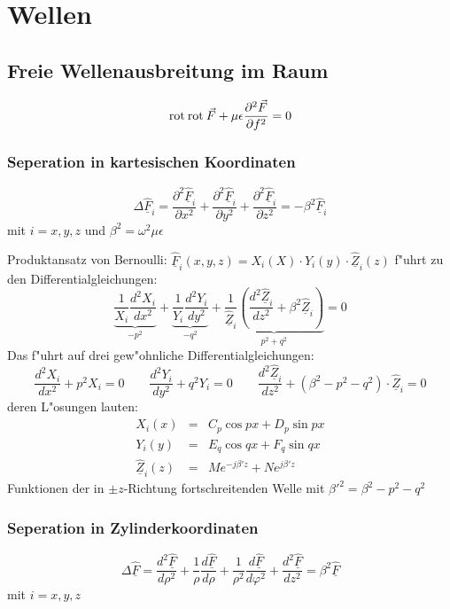 \clearpage \section{Wellen}
\subsection{Freie Wellenausbreitung im Raum}
$${\rm rot \:}{\rm rot \:} \vec{F}+\mu\epsilon\frac{\partial^2\vec{F}}{\partial f^2}=0$$

\subsubsection{Seperation in kartesischen Koordinaten}
$$\Delta\underline{\hat{F}}_i=\frac{\partial^2 \underline{\hat{F}}_i}{\partial
x^2}+\frac{\partial^2 \underline{\hat{F}}_i}{\partial
y^2}+\frac{\partial^2 \underline{\hat{F}}_i}{\partial
z^2}=-\beta^2\underline{\hat{F}}_i $$
mit $i=x,y,z$ und $\beta^2=\omega^2\mu\epsilon$

Produktansatz von Bernoulli:
$\underline{\hat{F}}_i(x,y,z)=X_i(X)\cdot Y_i(y)\cdot \underline{\hat{Z}}_i(z)$
f"uhrt zu den Differentialgleichungen:
$$\underbrace{\frac{1}{X_i}\frac{d^2X_i}{dx^2}}_{-p^2}+
  \underbrace{\frac{1}{Y_i}\frac{d^2Y_i}{dy^2}}_{-q^2}+\underbrace{\frac{1}{
   \underline{\hat{Z}}_i}\left(\frac{d^2\underline{\hat{Z}}_i}{dz^2}+\beta^2
   \underline{\hat{Z}}_i\right)}_{p^2+q^2}=0$$
Das f"uhrt auf drei gew"ohnliche Differentialgleichungen:
$$\frac{d^2X_i}{dx^2}+p^2X_i=0 \qquad \frac{d^2Y_i}{dy^2}+q^2Y_i=0 \qquad
\frac{d^2\underline{\hat{Z}}_i}{dz^2}+(\beta^2-p^2-q^2)\cdot\underline{\hat{Z}}_i=0$$
deren L"osungen lauten:
\begin{eqnarray*}
X_i(x)&=&C_p\cos px+D_p\sin px\\Y_i(y)&=&E_q\cos qx+F_q\sin qx\\\underline{\hat{Z}}_i
(z)&=&M e^{-j\beta ' z}+N e^{j\beta ' z}
\end{eqnarray*}
Funktionen der in $\pm z$-Richtung fortschreitenden Welle mit $\beta
'^2=\beta^2-p^2-q^2$

\subsubsection{Seperation in Zylinderkoordinaten}
$$\Delta\underline{\hat{F}}=\frac{d^2\underline{\hat{F}}}{d\rho^2}+\frac{1}{\rho}
  \frac{d\underline{\hat{F}}}{d\rho}+\frac{1}{\rho^2}
  \frac{d\underline{\hat{F}}}{d\varphi^2}
  +\frac{d^2\underline{\hat{F}}}{dz^2}=\beta^2\underline{\hat{F}}$$
  mit $i=x,y,z$

